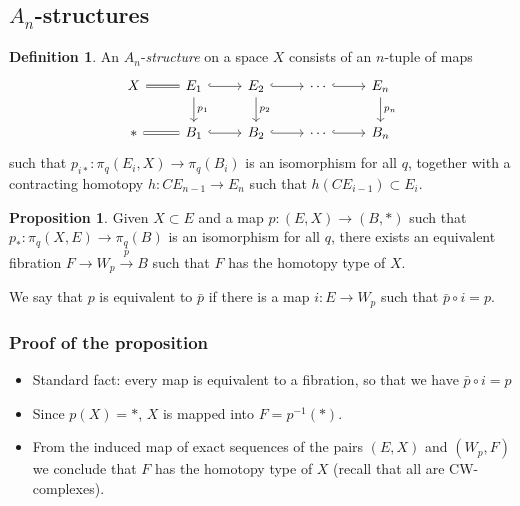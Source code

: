 \documentclass{beamer}
\theoremstyle{definition}
\newtheorem{defi}{Definition}
\newtheorem{prop}[teorema]{Proposition}
\begin{document}
\subsection{$A_n$-structures}
\begin{frame}[fragile]
\begin{defi}
An $A_n$-\emph{structure} on a space $X$ consists of an $n$-tuple of maps
\[
\begin{tikzcd}
X \arrow[r, equals] & E_1\arrow[r, hook]\arrow[d, "p_1"] & E_2\arrow[r, hook]\arrow[d, "p_2"] &\cdots\arrow[r, hook]& E_n\arrow[d, "p_n"] \\
*\arrow[r, equals] & B_1\arrow[r, hook] & 
B_2\arrow[r, hook]&\cdots\arrow[r, hook]& B_n
\end{tikzcd}
\]
such that $p_{i*}:\pi_q(E_i,X)\to \pi_q(B_i)$ is an isomorphism for all $q$, together with a contracting homotopy $h:CE_{n-1}\to E_n$ such that $h(CE_{i-1})\subset E_i$. %
\end{defi}
\end{frame}

\begin{frame}
\begin{prop}
Given $X\subset E$ and a map $p:(E,X)\to (B,*)$ such that $p_*:\pi_q(X,E)\to \pi_q(B)$ is an isomorphism for all $q$, there exists an equivalent fibration $F\to W_p\xrightarrow{\bar{p}} B$ such that $F$ has the homotopy type of $X$. 
\end{prop}\pause
We say that $p$ is equivalent to $\bar{p}$ if there is a map $i:E\to W_p$ such that $\bar{p}\circ i=p$.
 
\end{frame}
\begin{frame}
\frametitle{Proof of the proposition}
\begin{itemize}
\item<1-> Standard fact: every map is equivalent to a fibration, so that we have $\bar{p}\circ i=p$ %
\item<2-> Since $p(X)=*$, $X$ is mapped into $F=p^{-1}(*)$.
\item<3-> From the induced map of exact sequences of the pairs $(E,X)$ and $(W_p,F)$ we conclude that $F$ has the homotopy type of $X$ (recall that all are CW-complexes). 
\end{itemize}

\end{frame}
\end{document}
